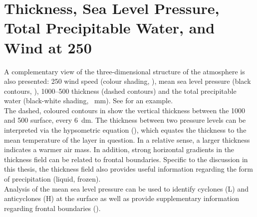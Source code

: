 \section{Thickness, Sea Level Pressure, Total Precipitable Water, and Wind at \SI{250}{\hPa}}
\label{sec:Geop}
A complementary view of the three-dimensional structure of the atmosphere is also presented:  \SI{250}{\hPa} wind speed (colour shading, \SI{}{\mPs}), mean sea level pressure (black contours, \SI{}{\hPa}), \num{1000}--\SI{500}{\hPa} thickness (dashed contours) and the total precipitable water (black-white shading, \SI{}{\mm}). See  for an example.
% 
\\
The dashed, coloured contours in  show the vertical thickness between the \SI{1000}{\hPa} and \SI{500}{\hPa} surface, every \SI{6}{\deca\meter}. The thickness between two pressure levels can be interpreted via the hypsometric equation (), which equates the thickness to the mean temperature of the layer in question. In a relative sense, a larger thickness indicates a warmer air mass. In addition, strong horizontal gradients in the thickness field can be related to frontal boundaries. Specific to the discussion in this thesis, the thickness field also provides useful information regarding the form of precipitation (liquid, frozen).
\\
Analysis of the mean sea level pressure can be used to identify cyclones (L) and anticyclones (H) at the surface as well as provide supplementary information regarding frontal boundaries ().
